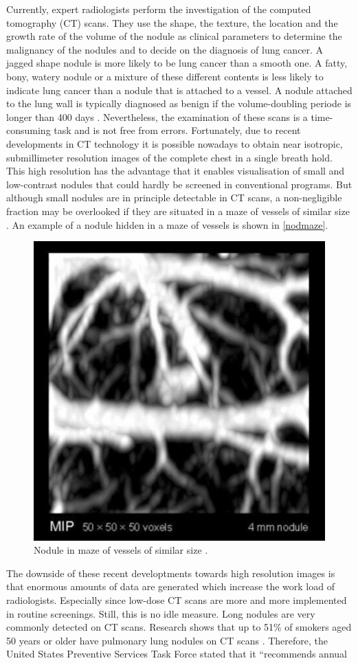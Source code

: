 Currently, expert radiologists perform the investigation of the computed
tomography (CT) scans. They use the shape, the texture, the location and the
growth rate of the volume of the nodule as clinical parameters to determine the
malignancy of the nodules and to decide on the diagnosis of lung cancer. A
jagged shape nodule is more likely to be lung cancer than a smooth one. A fatty,
bony, watery nodule or a mixture of these different contents is less likely to
indicate lung cancer than a nodule that is attached to a vessel. A nodule
attached to the lung wall is typically diagnosed as benign if the
volume-doubling periode is longer than 400 days \cite{wu}. Nevertheless, the
examination of these scans is a time-consuming task and is not free from errors.
Fortunately, due to recent developments in CT technology it is possible nowadays
to obtain near isotropic, submillimeter resolution images of the complete chest
in a single breath hold. This high resolution has the advantage that it enables
visualisation of small and low-contrast nodules that could hardly be screened in
conventional programs. But although small nodules are in principle detectable in
CT scans, a non-negligible fraction may be overlooked if they are situated in a
maze of vessels of similar size \cite{ozekes}. An example of a nodule hidden in
a maze of vessels is shown in \autoref{nodmaze}.
\begin{figure}[htp]
\begin{center}
  \includegraphics[width= 30 mm]{img/noduleMaze.png}
  \caption{Nodule in maze of vessels of similar size \cite{wiemkerfig}.}
  \label{nodmaze}
\end{center}
\end{figure}
The downside of these recent developtments towards high resolution images is
that enormous amounts of data are generated which increase the work load of radiologists.
Especially since low-dose CT scans are more and more implemented in routine
screenings. Still, this is no idle measure. Long nodules are very commonly
detected on CT scans. Research shows that up to 51\% of smokers aged 50 years or
older have pulmonary lung nodules on CT scans \cite{mahon}. Therefore, the
United States Preventive Services Task Force stated that it ``recommends annual
